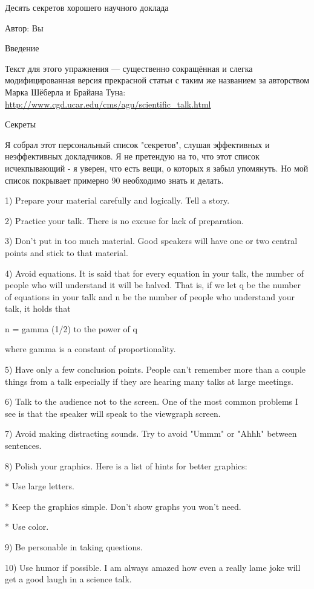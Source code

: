 \documentclass[12pt]{article}
\begin{document}
Десять секретов хорошего научного доклада

Автор: Вы

Введение

Текст для этого упражнения --- существенно сокращённая и слегка модифицированная версия прекрасной статьи с таким же названием за
авторством Марка Шёберла и Брайана Туна:
\url{http://www.cgd.ucar.edu/cms/agu/scientific_talk.html}

Секреты

Я собрал этот персональный список "секретов", слушая эффективных и неэффективных докладчиков. Я не претендую на то, что этот
список исчекпывающий - я уверен, что есть вещи, о которых я забыл упомянуть. Но мой список покрывает примерно 90%
необходимо знать и делать.

1) Prepare your material carefully and logically. Tell a story.

2) Practice your talk. There is no excuse for lack of preparation.

3) Don't put in too much material. Good speakers will have one or two central points and stick to that material.

4) Avoid equations. It is said that for every equation in your talk, the number of people who will understand it will be halved. That is, if we let q be the number of equations in your talk and n be the number of people who understand your talk, it holds that

n = gamma (1/2) to the power of q

where gamma is a constant of proportionality.

5) Have only a few conclusion points. People can't remember more than a couple things from a talk especially if they are hearing many talks at large meetings.

6) Talk to the audience not to the screen. One of the most common problems I see is that the speaker will speak to the viewgraph screen.

7) Avoid making distracting sounds. Try to avoid "Ummm" or "Ahhh" between sentences.

8) Polish your graphics. Here is a list of hints for better graphics:

* Use large letters.

* Keep the graphics simple. Don't show graphs you won't need.

* Use color.

9) Be personable in taking questions.

10) Use humor if possible. I am always amazed how even a really lame joke will get a good laugh in a science talk.
\end{document}
